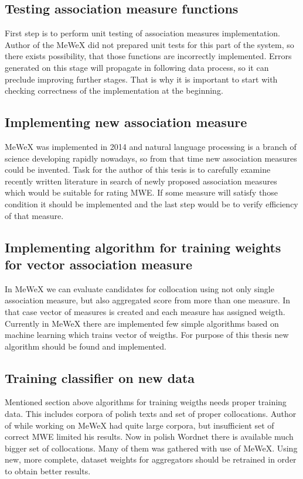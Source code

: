 \subsection{Testing association measure functions}
First step is to perform unit testing of association measures implementation. Author of the MeWeX did not prepared unit tests for this part of the system, 
so there exists possibility, that those functions are incorrectly implemented. Errors generated on this stage will propagate in following data process, 
so it can preclude improving further stages. That is why it is important to start with checking correctness of the implementation 
at the beginning.

\subsection{Implementing new association measure}
MeWeX was implemented in 2014 and natural language processing is a branch of science developing rapidly nowadays, 
so from that time new association measures could be invented. Task for the author of this tesis is to carefully examine recently written literature 
in search of newly proposed association measures which would be suitable for rating MWE. If some measure will satisfy those condition it should 
be implemented and the last step would be to verify efficiency of that measure.

\subsection{Implementing algorithm for training weights for vector association measure}
In MeWeX we can evaluate candidates for collocation using not only single association measure, but also aggregated score from more than one measure. 
In that case vector of measures is created and each measure has assigned weigth. Currently in MeWeX there are implemented few simple algorithms 
based on machine learning which trains vector of weigths. For purpose of this thesis new algorithm should be found and implemented.

\subsection{Training classifier on new data}
Mentioned section above algorithms for training weigths needs proper training data. This includes corpora of polish texts and set 
of proper collocations. Author of \cite{mgr} while working on MeWeX had quite large corpora, but insufficient set of correct MWE limited his results. 
Now in polish Wordnet there is available much bigger set of collocations. Many of them was gathered with use of MeWeX.
Using new, more complete, dataset weights for aggregators should be retrained in order to obtain better results.


